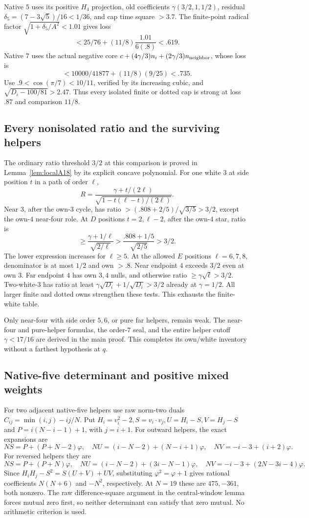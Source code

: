 \documentclass[11pt]{article}
\theoremstyle{definition}
\theoremstyle{remark}
\begin{document}
Native \(5\) uses its positive \(H_4\) projection,
old coefficients \(\gamma(3/2,1,1/2)\),
residual \(\delta_5=(7-3\sqrt5)/16<1/36\),
and cap time square \(>3.7\).
The finite-point radical factor
\(\sqrt{1+\delta_5/A^2}<1.01\) gives loss
\[
 <25/76+(11/8)\frac{1.01}{6(.8)}<.619.
\]
Native \(7\) uses the actual negative core
\(c+(4\gamma/3)n_i+(2\gamma/3)n_{\rm neighbor}\),
whose loss is
\[
 <10000/41877+(11/8)(9/25)<.735.
\]
Use \(.9<\cos(\pi/7)<10/11\), verified
by its increasing cubic, and
\(\sqrt{D_i-100/81}>2.47\).
Thus every isolated finite or dotted cap is
strong at loss \(.87\) and comparison \(11/8\).

\subsection{Every nonisolated ratio and the surviving helpers}
The ordinary ratio threshold \(3/2\) at this
comparison is proved in Lemma~\ref{lem:localA18}
by its explicit concave polynomial.
For one white \(3\) at side position \(t\)
in a path of order \(\ell\),
\[
 R=\frac{\gamma+t/(2\ell)}
          {\sqrt{1-t(\ell-t)/(2\ell)}}.
\]
Near \(3\), after the own-\(3\) cycle, has ratio
\(>(.808+2/5)/\sqrt{3/5}>3/2\),
except the own-\(4\) near-four role.
At \(D\) positions \(t=2,\ell-2\), after the
own-\(4\) star, ratio is
\[
 \geq\frac{\gamma+1/\ell}{\sqrt{2/\ell}}
 >\frac{.808+1/5}{\sqrt{2/5}}>3/2.
\]
The lower expression increases for \(\ell\geq5\).
At the allowed \(E\) positions \(\ell=6,7,8\),
denominator is at most \(1/2\) and own \(>.8\).
Near endpoint \(4\) exceeds \(3/2\) even at
own \(3\). Far endpoint \(4\) has own \(3,4\)
nulls, and otherwise ratio
\(\geq\gamma\sqrt\ell>3/2\).
Two-white-\(3\) has ratio at least
\(\gamma\sqrt{D_i}+1/\sqrt{D_i}>3/2\)
already at \(\gamma=1/2\).
All larger finite and dotted owns strengthen
these tests. This exhausts the finite-white table.

Only near-four with side order \(5,6\), or
pure far helpers, remain weak. The near-four
and pure-helper formulas, the order-\(7\) seal,
and the entire helper cutoff \(\gamma<17/16\)
are derived in the main proof.
This completes its own/white inventory without
a farthest hypothesis at \(q\).

\subsection{Native-five determinant and positive mixed weights}
For two adjacent native-five helpers use raw
norm-two duals \(C_{ij}=\min(i,j)-ij/N\).
Put \(H_i=v_i^2-2,S=v_i\cdot v_j,U=H_i-S,V=H_j-S\)
and \(P=i(N-i-1)+1\), with \(j=i+1\).
For outward helpers, the exact expansions are
\[
 NS=P+(P+N-2)\varphi,\quad
 NU=(i-N-2)+(N-i+1)\varphi,\quad
 NV=-i-3+(i+2)\varphi.
\]
For reversed helpers they are
\[
 NS=P+(P+N)\varphi,\quad
 NU=(i-N-2)+(3i-N-1)\varphi,\quad
 NV=-i-3+(2N-3i-4)\varphi.
\]
Since \(H_iH_j-S^2=S(U+V)+UV\), substituting
\(\varphi^2=\varphi+1\) gives rational coefficients
\(N(N+6)\) and \(-N^2\), respectively.
At \(N=19\) these are \(475,-361\), both nonzero.
The raw difference-square argument in the
central-window lemma forces mutual zero first,
so neither determinant can satisfy that zero
mutual. No arithmetic criterion is used.
\end{document}
